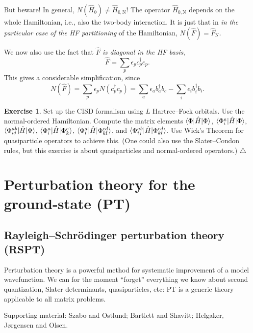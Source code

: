 \documentclass{report}
\theoremstyle{plain}
\theoremstyle{definition}
\newtheorem{exerc}{Exercise}[chapter]
\newcommand\xqed[1]{%
  \leavevmode\unskip\penalty9999 \hbox{}\nobreak\hfill
  \quad\hbox{#1}}
\newcommand\demo{\xqed{$\triangle$}}
\newenvironment{exercise}{\bigskip\begin{exerc}}{\demo\end{exerc}\bigskip}
\begin{document}
But beware! In general, $N(\hat{H}_0) \neq \hat{H}_{0,\text{N}}$! The
operator $\hat{H}_{0,\text{N}}$ depends on the whole Hamiltonian,
i.e., also the two-body interaction. It is just that in \emph{in the
  particular case of the HF partitioning} of the Hamiltonian,
$N(\hat{F}) = \hat{F}_\text{N}$.

We now also use the fact that $\hat{F}$ \emph{is diagonal in the HF basis},
\begin{equation}
  \hat{F} = \sum_p \epsilon_p c^\dag_p c_p.
\end{equation}
This gives a considerable simplification, since
\begin{equation}
  N(\hat{F}) = \sum_p \epsilon_p N(c^\dag_p c_p) = \sum_a \epsilon_a
  b^\dag_a b_c - \sum_i \epsilon_i b^\dag_i b_i.
\end{equation}

\begin{exercise}
  Set up the CISD formalism using $L$ Hartree--Fock orbitals. Use the
  normal-ordered Hamiltonian. Compute the
  matrix elements $\braket{\Phi|\hat{H}|\Phi}$,
  $\braket{\Phi_i^a|\hat{H}|\Phi}$,
  $\braket{\Phi_{ij}^{ab}|\hat{H}|\Phi}$,
  $\braket{\Phi_i^a|\hat{H}|\Phi_k^c}$,
  $\braket{\Phi_{i}^{a}|\hat{H}|\Phi_{kl}^{cd}}$, and
  $\braket{\Phi_{ij}^{ab}|\hat{H}|\Phi_{kl}^{cd}}$. Use Wick's Theorem
  for quasiparticle operators to achieve this. (One could also use the
  Slater--Condon rules, but this exercise is about quasiparticles and
  normal-ordered operators.)
\end{exercise}  

\section{Perturbation theory for the ground-state (PT)} 
\label{sec:perturbation-theory}

\subsection{Rayleigh--Schr\"odinger perturbation theory (RSPT)}
\label{sec:rspt}

Perturbation theory is a powerful method for systematic improvement of
a model wavefunction. We can for the moment ``forget'' everything we know about
second quantization, Slater determinants, quasiparticles, etc: PT is a
generic theory applicable to all matrix problems.

Supporting material: Szabo and Ostlund; Bartlett and Shavitt;
Helgaker, J{\o}rgensen and Olsen.
\end{document}
